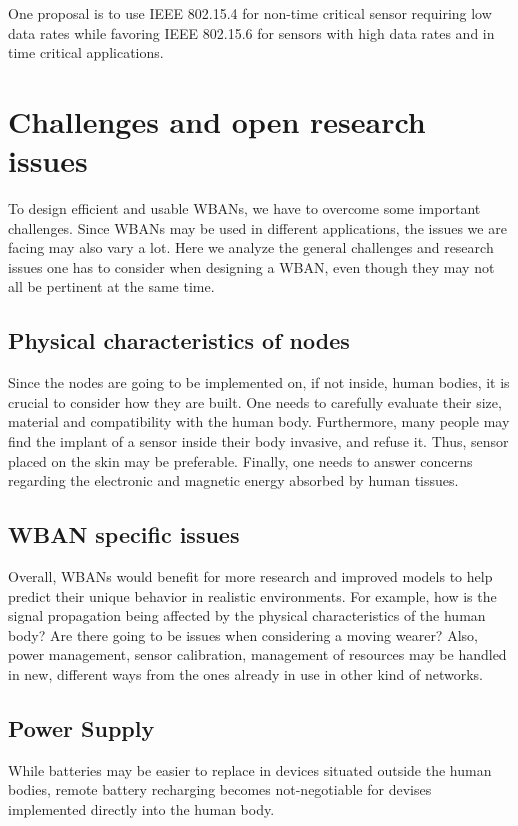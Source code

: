 \documentclass[conference]{IEEEtran}
\begin{document}
One proposal \cite{nabila2019qos} is to use IEEE 802.15.4 for non-time critical sensor requiring low data rates while favoring IEEE 802.15.6 for sensors with high data rates and in time critical applications. 

\section{Challenges and open research issues}
To design efficient and usable WBANs, we have to overcome some important challenges. Since WBANs may be used in different applications, the issues we are facing may also vary a lot. Here we analyze the general challenges and research issues one has to consider when designing a WBAN, even though they may not all be pertinent at the same time.

\subsection {Physical characteristics of nodes}
Since the nodes are going to be implemented on, if not inside, human bodies, it is crucial to consider how they are built. One needs to carefully evaluate their size, material and compatibility with the human body. Furthermore, many people may find the implant of a sensor inside their body invasive, and refuse it. Thus, sensor placed on the skin may be preferable. Finally, one needs to answer concerns regarding the electronic and magnetic energy absorbed by human tissues.

\subsection {WBAN specific issues}
Overall, WBANs would benefit for more research and improved models to help predict their unique behavior in realistic environments. For example, how is the signal propagation being affected by the physical characteristics of the human body? Are there going to be issues when considering a moving wearer? Also, power management, sensor calibration, management of resources may be handled in new, different ways from the ones already in use in other kind of networks.

\subsection {Power Supply}
While batteries may be easier to replace in devices situated outside the human bodies, remote battery recharging becomes not-negotiable for devises implemented directly into the human body.
\end{document}
